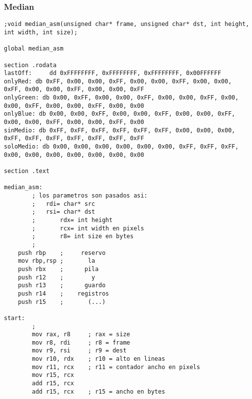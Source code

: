 \subsubsection{Median}
\begin{verbatim}
;void median_asm(unsigned char* frame, unsigned char* dst, int height, int width, int size);

global median_asm

section .rodata
lastOff:     dd 0xFFFFFFFF, 0xFFFFFFFF, 0xFFFFFFFF, 0x00FFFFFF
onlyRed: db 0xFF, 0x00, 0x00, 0xFF, 0x00, 0x00, 0xFF, 0x00, 0x00, 0xFF, 0x00, 0x00, 0xFF, 0x00, 0x00, 0xFF
onlyGreen: db 0x00, 0xFF, 0x00, 0x00, 0xFF, 0x00, 0x00, 0xFF, 0x00, 0x00, 0xFF, 0x00, 0x00, 0xFF, 0x00, 0x00
onlyBlue: db 0x00, 0x00, 0xFF, 0x00, 0x00, 0xFF, 0x00, 0x00, 0xFF, 0x00, 0x00, 0xFF, 0x00, 0x00, 0xFF, 0x00
sinMedio: db 0xFF, 0xFF, 0xFF, 0xFF, 0xFF, 0xFF, 0x00, 0x00, 0x00, 0xFF, 0xFF, 0xFF, 0xFF, 0xFF, 0xFF, 0xFF
soloMedio: db 0x00, 0x00, 0x00, 0x00, 0x00, 0x00, 0xFF, 0xFF, 0xFF, 0x00, 0x00, 0x00, 0x00, 0x00, 0x00, 0x00

section .text

median_asm:
        ; los parametros son pasados asi:
        ;	rdi= char* src
        ;	rsi= char* dst
        ;       rdx= int height
        ;       rcx= int width en pixels
        ;       r8= int size en bytes
        ;
	push rbp	;     reservo
	mov rbp,rsp	;       la
	push rbx	;      pila
	push r12	;        y
	push r13	;      guardo
	push r14	;    registros
	push r15	;		(...)

start:
        ;
        mov rax, r8     ; rax = size
        mov r8, rdi     ; r8 = frame
        mov r9, rsi     ; r9 = dest
        mov r10, rdx    ; r10 = alto en lineas
        mov r11, rcx    ; r11 = contador ancho en pixels
        mov r15, rcx
        add r15, rcx
        add r15, rcx    ; r15 = ancho en bytes
        

\end{verbatim}
